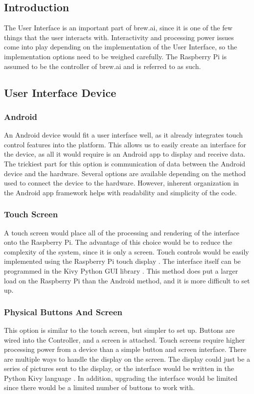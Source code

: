 \subsection{Introduction}
The User Interface is an important part of brew.ai, since it is one of the few things that the user interacts with.
Interactivity and processing power issues come into play depending on the implementation of the User Interface, so the implementation options need to be weighed carefully.
The Raspberry Pi is assumed to be the controller of brew.ai and is referred to as such.

\subsection{User Interface Device}

\subsubsection{Android}
An Android device would fit a user interface well, as it already integrates touch control features into the platform.
This allows us to easily create an interface for the device, as all it would require is an Android app to display and receive data.
The trickiest part for this option is communication of data between the Android device and the hardware.
Several options are available depending on the method used to connect the device to the hardware.
However, inherent organization in the Android app framework helps with readability and simplicity of the code.

\subsubsection{Touch Screen}
A touch screen would place all of the processing and rendering of the interface onto the Raspberry Pi.
The advantage of this choice would be to reduce the complexity of the system, since it is only a screen.
Touch controls would be easily implemented using the Raspberry Pi touch display \cite{TouchScreen}.
The interface itself can be programmed in the Kivy Python GUI library \cite{Kivy}.
This method does put a larger load on the Raspberry Pi than the Android method, and it is more difficult to set up.

\subsubsection{Physical Buttons And Screen}
This option is similar to the touch screen, but simpler to set up.
Buttons are wired into the Controller, and a screen is attached.
Touch screens require higher processing power from a device than a simple button and screen interface.
There are multiple ways to handle the display on the screen.
The display could just be a series of pictures sent to the display, or the interface would be written in the Python Kivy language \cite{Kivy}.
In addition, upgrading the interface would be limited since there would be a limited number of buttons to work with.

